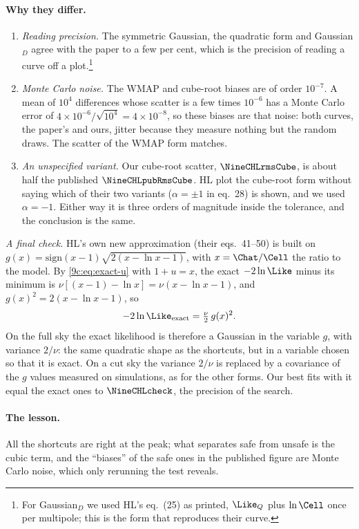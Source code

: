 \paragraph{Why they differ.}
\begin{enumerate}[itemsep=1pt]
  \item \emph{Reading precision.} The symmetric Gaussian, the quadratic form and Gaussian$_D$ agree with the paper
        to a few per cent, which is the precision of reading a curve off a plot.\footnote{For Gaussian$_D$ we used
        HL's eq.~(25) as printed, $\Like_Q$ plus $\ln\Cell$ once per multipole; this is the form that reproduces
        their curve.}
  \item \emph{Monte Carlo noise.} The WMAP and cube-root biases are of order $10^{-7}$. A mean of $10^4$ differences
        whose scatter is a few times $10^{-6}$ has a Monte Carlo error of $4\times10^{-6}/\sqrt{10^4}=4\times10^{-8}$,
        so these biases are that noise: both curves, the paper's and ours, jitter because they measure nothing
        but the random draws. The scatter of the WMAP form matches.
  \item \emph{An unspecified variant.} Our cube-root scatter, $\NineCHLrmsCube$, is about half the published
        $\NineCHLpubRmsCube$. HL plot the cube-root form without saying which of their two variants ($\alpha=\pm1$
        in eq.~28) is shown, and we used $\alpha=-1$. Either way it is three orders of magnitude inside the
        tolerance, and the conclusion is the same.
\end{enumerate}
\emph{A final check.} HL's own new approximation (their eqs.~41--50) is built on
$g(x)=\mathrm{sign}(x-1)\sqrt{2(x-\ln x-1)}$, with $x=\Chat/\Cell$ the ratio to the model. By
\eqref{9c:eq:exact-u} with $1+u=x$, the exact $-2\ln\Like$ minus its minimum is $\nu[(x-1)-\ln x]=\nu(x-\ln x-1)$,
and $g(x)^2=2(x-\ln x-1)$, so
\[
  -2\ln\Like_{\rm exact}=\tfrac\nu2\,g(x)^2 .
\]
On the full sky the exact likelihood is therefore a Gaussian in the variable $g$, with variance $2/\nu$: the
same quadratic shape as the shortcuts, but in a variable chosen so that it is exact. On a cut sky the variance
$2/\nu$ is replaced by a covariance of the $g$ values measured on simulations, as for the other forms. Our best
fits with it equal the exact ones to $\NineCHLcheck$, the precision of the search.

\paragraph{The lesson.} All the shortcuts are right at the peak; what separates safe from unsafe is the cubic
term, and the ``biases'' of the safe ones in the published figure are Monte Carlo noise, which only rerunning
the test reveals.

